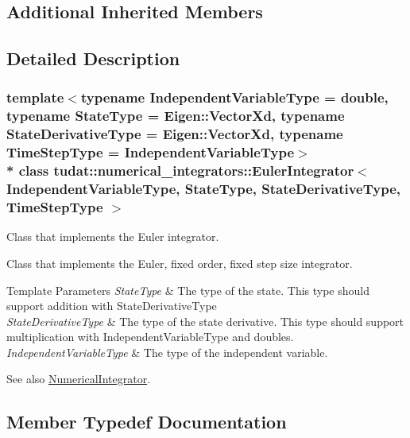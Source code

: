 \subsection*{Additional Inherited Members}


\subsection{Detailed Description}
\subsubsection*{template$<$typename Independent\+Variable\+Type = double, typename State\+Type = Eigen\+::\+Vector\+Xd, typename State\+Derivative\+Type = Eigen\+::\+Vector\+Xd, typename Time\+Step\+Type = Independent\+Variable\+Type$>$\\*
class tudat\+::numerical\+\_\+integrators\+::\+Euler\+Integrator$<$ Independent\+Variable\+Type, State\+Type, State\+Derivative\+Type, Time\+Step\+Type $>$}

Class that implements the Euler integrator. 

Class that implements the Euler, fixed order, fixed step size integrator. 
\begin{DoxyTemplParams}{Template Parameters}
{\em State\+Type} & The type of the state. This type should support addition with State\+Derivative\+Type \\
\hline
{\em State\+Derivative\+Type} & The type of the state derivative. This type should support multiplication with Independent\+Variable\+Type and doubles. \\
\hline
{\em Independent\+Variable\+Type} & The type of the independent variable. \\
\hline
\end{DoxyTemplParams}
\begin{DoxySeeAlso}{See also}
\hyperlink{classtudat_1_1numerical__integrators_1_1NumericalIntegrator}{Numerical\+Integrator}. 
\end{DoxySeeAlso}


\subsection{Member Typedef Documentation}
